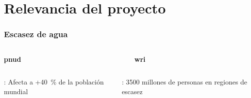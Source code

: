 \section{Relevancia del proyecto}

\begin{frame}
    \frametitle{Escasez de agua}
    
    \begin{columns}
        \begin{column}{0.5\textwidth}
        		\Large\bfseries\centering \acrshort{pnud}
        \end{column}
        \begin{column}{0.5\textwidth}
        		\Large\bfseries\centering \acrshort{wri}
        \end{column}
    \end{columns}
    
    \vspace*{5mm}
    
    \begin{columns}
        \begin{column}{0.5\textwidth}
	        	: Afecta a +\qty{40}{\percent} de la población mundial
        \end{column}
        \begin{column}{0.5\textwidth}
        		: 3500 millones de personas en regiones de escasez
        \end{column}
    \end{columns}
    
    \vspace*{5mm}
    

\end{frame}
